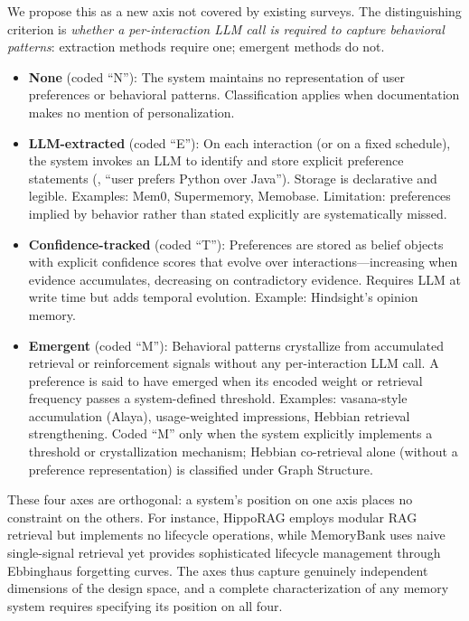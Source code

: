 We propose this as a new axis not covered by existing surveys. The
distinguishing criterion is \emph{whether a per-interaction LLM call is
required to capture behavioral patterns}: extraction methods require one;
emergent methods do not.

\begin{itemize}[leftmargin=*, nosep]
    \item \textbf{None} (coded ``N''): The system maintains no representation
    of user preferences or behavioral patterns. Classification applies when
    documentation makes no mention of personalization.

    \item \textbf{LLM-extracted} (coded ``E''): On each interaction (or
    on a fixed schedule), the system invokes an LLM to identify and store
    explicit preference statements (\eg, ``user prefers Python over Java'').
    Storage is declarative and legible. Examples: Mem0, Supermemory,
    Memobase. Limitation: preferences implied by behavior rather than
    stated explicitly are systematically missed.

    \item \textbf{Confidence-tracked} (coded ``T''): Preferences are stored
    as belief objects with explicit confidence scores that evolve over
    interactions---increasing when evidence accumulates, decreasing on
    contradictory evidence. Requires LLM at write time but adds temporal
    evolution. Example: Hindsight's opinion memory.

    \item \textbf{Emergent} (coded ``M''): Behavioral patterns crystallize
    from accumulated retrieval or reinforcement signals without any
    per-interaction LLM call. A preference is said to have emerged when
    its encoded weight or retrieval frequency passes a system-defined
    threshold. Examples: vasana-style accumulation (Alaya), usage-weighted
    impressions, Hebbian retrieval strengthening. Coded ``M'' only when
    the system explicitly implements a threshold or crystallization
    mechanism; Hebbian co-retrieval alone (without a preference
    representation) is classified under Graph Structure.
\end{itemize}

\medskip

These four axes are orthogonal: a system's position on one axis places
no constraint on the others. For instance, HippoRAG employs modular RAG
retrieval but implements no lifecycle operations, while MemoryBank uses
naive single-signal retrieval yet provides sophisticated lifecycle
management through Ebbinghaus forgetting curves. The axes thus capture
genuinely independent dimensions of the design space, and a complete
characterization of any memory system requires specifying its position
on all four.
